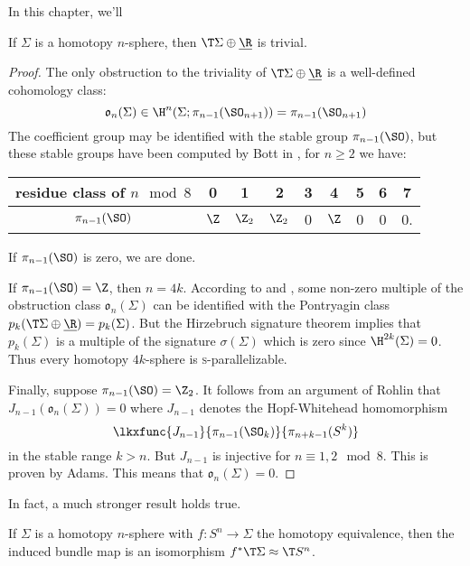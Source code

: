 In this chapter, we'll 

\begin{theorem}\label{thm:homotopy_spheres_are_stably_parallelizable}
  If $\Sigma$ is a homotopy $n$-sphere, then $\T \Sigma \oplus \underline{\R}$ is trivial. 
\end{theorem}
\begin{proof}
	The only obstruction to the triviality of $\T\Sigma\oplus\underline{\R}$ is a well-defined cohomology class:
	\[
		\mathfrak{o}_n(\Sigma) \in \H^n(\Sigma; \pi_{n-1}(\SO_{n+1})) = \pi_{n-1}(\SO_{n+1})
	\]
	The coefficient group may be identified with the stable group $\pi_{n-1}(\SO)$, but these stable groups have been computed by Bott in \cite{bott1957}, for $n\geq 2$ we have:
	\begin{center}
		\begin{tabular}{c|cccccccc}
			\textrm{residue class of $n\mod 8$} & 0 & 1 & 2 & 3 & 4 & 5 & 6 & 7\\
			\hline
			$\pi_{n-1}(\SO)$ & $\Z$ & $\Z_2$ & $\Z_2$ & 0 & $\Z$ & 0 & 0 & 0.
		\end{tabular}
	\end{center}
	If $\pi_{n-1}(\SO)$ is zero, we are done. 

	If $\pi_{n-1}(\SO) = \Z$, then $n=4k$. According to \cite{kervairemilnor1960} and \cite{kervaire1959}, some non-zero multiple of the obstruction class $\mathfrak{o}_n(\Sigma)$ can be identified with the Pontryagin class $p_k(\T \Sigma\oplus \underline{\R}) = p_k(\Sigma)$.  But the Hirzebruch signature theorem implies  that $p_k(\Sigma)$ is a multiple of the signature $\sigma(\Sigma)$ which is zero since $\H^{2k}(\Sigma)=0$. Thus every homotopy $4k$-sphere is \textsc{s}-parallelizable. 

	Finally, suppose $\pi_{n-1}(\SO)= \Z_2$. It follows from an argument of Rohlin  that $J_{n-1}(\mathfrak{o}_n(\Sigma))=0$ where $J_{n-1}$ denotes the Hopf-Whitehead homomorphism
	\[
		\lkxfunc{J_{n-1}}{\pi_{n-1}(\SO_k)}{\pi_{n+k-1}(S^k)}
	\]
	in the stable range $k >n$. But $J_{n-1}$ is injective for $n\equiv 1, 2\mod 8$. This is proven by Adams.  This means that $\mathfrak{o}_n(\Sigma)=0$.
\end{proof}

In fact, a much stronger result holds true.
\begin{theorem}\label{thm:homotopy_spheres_tangent_bundle}
  If $\Sigma$ is a homotopy $n$-sphere with $f : S^n \to \Sigma$ the homotopy equivalence, then the induced bundle map is an isomorphism $f^*\T\Sigma \approx \T S^n$.
\end{theorem}
